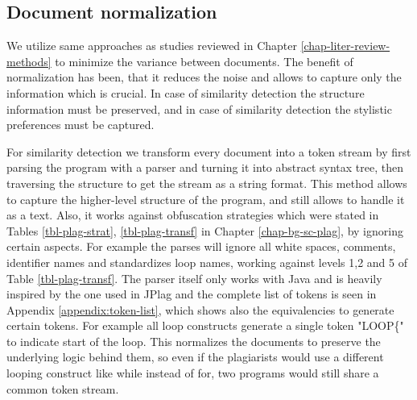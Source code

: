 
\subsection{Document normalization}

We utilize same approaches as studies reviewed in Chapter \ref{chap-liter-review-methods} to minimize the variance between documents. The benefit of normalization has been, that it reduces the noise and allows to capture only the information which is crucial. In case of similarity detection the structure information must be preserved, and in case of similarity detection the stylistic preferences must be captured.

For similarity detection we transform every document into a token stream by first parsing the program with a parser and turning it into abstract syntax tree, then traversing the structure to get the stream as a string format. This method allows to capture the higher-level structure of the program, and still allows to handle it as a text. Also, it works against obfuscation strategies which were stated in Tables \ref{tbl-plag-strat}, \ref{tbl-plag-transf} in Chapter \ref{chap-bg-sc-plag}, by ignoring certain aspects. For example the parses will ignore all white spaces, comments, identifier names and standardizes loop names, working against levels 1,2 and 5 of Table \ref{tbl-plag-transf}. The parser itself only works with Java and is heavily inspired by the one used in JPlag \cite{prechelt2002finding} and the complete list of tokens is seen in Appendix \ref{appendix:token-list}, which shows also the equivalencies to generate certain tokens. For example all loop constructs generate a single token "LOOP\{" to indicate start of the loop. This normalizes the documents to preserve the underlying logic behind them, so even if the plagiarists would use a different looping construct like while instead of for, two programs would still share a common token stream. 

